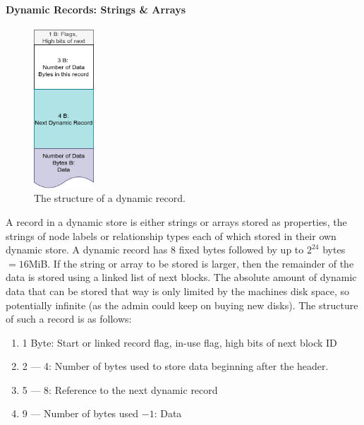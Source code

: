             \paragraph{Dynamic Records: Strings \& Arrays}\label{dynamic}
                \begin{figure}[htp]\label{dynamic_rec}
                    \begin{center}
                        \includegraphics[keepaspectratio,height=0.2\textheight,width=0.2\textwidth]{img/03_record/dynamic.png}
                    \end{center}
                    \caption{The structure of a dynamic record.} %
                \end{figure}
                A record in a dynamic store is either strings or arrays stored as properties,  the strings of node labels or relationship types each of which stored in their own dynamic store.
                A dynamic record has 8 fixed bytes followed by up to $2^{24}$ bytes $= 16 $MiB.
                If the string or array to be stored is larger, then the remainder of the data is stored using a linked list of next blocks.
                The absolute amount of dynamic data that can be stored that way is only limited by the machines disk space, so potentially infinite (as the admin could keep on buying new disks). 
                The structure of such a record is as follows:
                \begin{enumerate}
                    \item 1 Byte: Start or linked record flag, in-use flag, high bits of next block ID
                    \item 2 --- 4: Number of bytes used to store data beginning after the header.
                    \item 5 --- 8: Reference to the next dynamic record
                    \item 9 --- Number of bytes used $- 1$: Data
                \end{enumerate}
                
